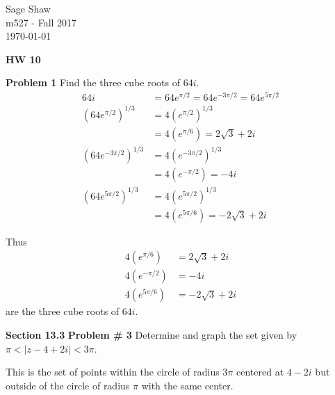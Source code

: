 \documentclass[12pt]{article}
\newcommand{\problem}[1]{\hspace{-4 ex} \large \textbf{Problem #1} }
\begin{document}
	\thispagestyle{empty}
	
	\begin{flushright}
		Sage Shaw \\
		m527 - Fall 2017 \\
		\today
	\end{flushright}
	
{\large \textbf{HW 10}}\bigbreak

\problem{1} Find the three cube roots of $64i$. \\

	\begin{align*}
		64i & = 64e^{\pi/2} = 64e^{-3\pi/2} = 64e^{5\pi/2} \\
		(64e^{\pi/2})^{1/3} & = 4(e^{\pi/2})^{1/3} \\
		& = 4(e^{\pi/6}) = 2\sqrt{3}+2i \\
		(64e^{-3\pi/2})^{1/3} & = 4(e^{-3\pi/2})^{1/3} \\
		& = 4(e^{-\pi/2}) = -4i \\
		(64e^{5\pi/2})^{1/3} & = 4(e^{5\pi/2})^{1/3} \\
		& = 4(e^{5\pi/6}) = -2\sqrt{3}+2i
	\end{align*}
	
	Thus 
	\begin{align*}
		4(e^{\pi/6}) &= 2\sqrt{3}+2i \\
		4(e^{-\pi/2}) &= -4i \\
		4(e^{5\pi/6}) &= -2\sqrt{3}+2i
	\end{align*}
	are the three cube roots of $64i$.
	\bigbreak

{\hspace{-4 ex} \large \textbf{Section 13.3}}\bigbreak
\problem{\# 3} Determine and graph the set given by $\pi < \vert z - 4 + 2i \vert < 3\pi$. \bigbreak

	This is the set of points within the circle of radius $3\pi$ centered at $4-2i$ but outside of the circle of radius $\pi$ with the same center.
	
\end{document}
